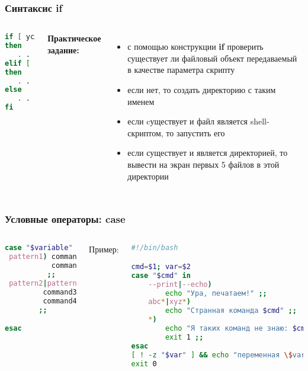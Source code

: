 
\begin{frame}[fragile]
\frametitle{Синтаксис {\bf if}}

	\begin{columns}
	
	\begin{lstlisting}[language=bash]
if [ условие1 ]
then
   . . .
elif [ условие2 ]
then
   . . .
else
   . . .
fi
\end{lstlisting}
	{\bf Практическое задание:} \\
	\begin{itemize}

		\item с помощью конструкции {\bf if} проверить существует ли файловый объект передаваемый в качестве параметра скрипту
		\item если нет, то создать директорию с таким именем
		\item если cуществует и файл является shell-скриптом, то запустить его
		\item если существует и является директорией, то вывести на экран первых 5 файлов в этой директории
	\end{itemize}
	\end{columns}
\end{frame}

\begin{frame}[fragile]
\frametitle{Условные операторы: case}

	\small
	\begin{columns}
		\column{0.4\textwidth}

		\begin{lstlisting}[language=sh,frame=single]
case "$variable" in 
 pattern1) command1
           command2
          ;;
 pattern2|pattern3)
         command3
         command4
        ;;

esac
		\end{lstlisting}
		\pause

		\column{0.6\textwidth}
		{\normalsize Пример:}

		\begin{lstlisting}[language=sh]
#!/bin/bash

cmd=$1; var=$2
case "$cmd" in 
	--print|--echo)
		echo "Ура, печатаем!" ;;
	abc*|xyz*)
		echo "Странная команда $cmd" ;;
	*)
		echo "Я таких команд не знаю: $cmd" 1>&2
		exit 1 ;;
esac
[ ! -z "$var" ] && echo "переменная \$var=$var"
exit 0
		\end{lstlisting}


	\end{columns}
\end{frame}

